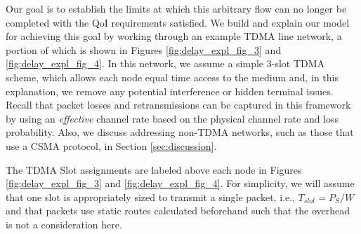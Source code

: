 Our goal is to establish the limits at which this arbitrary flow can no longer be completed with the QoI requirements satisfied.  {\color{blue}We build and explain our model for achieving this goal by working through an example TDMA line network, a portion of which is shown in Figures \ref{fig:delay_expl_fig_3} and \ref{fig:delay_expl_fig_4}. In this network, we assume a simple 3-slot TDMA scheme, which allows each node equal time access to the medium and, in this explanation, we remove any potential interference or hidden terminal issues. Recall that packet losses and retransmissions can be captured in this framework by using an \emph{effective} channel rate based on the physical channel rate and loss probability. Also, we discuss addressing non-TDMA networks, such as those that use a CSMA protocol, in Section \ref{sec:discussion}. }

The TDMA Slot assignments are labeled above each node in Figures \ref{fig:delay_expl_fig_3} and \ref{fig:delay_expl_fig_4}.  For simplicity, we will assume that one slot is appropriately sized to transmit a single packet, i.e., $T_{slot} = P_S/W$ and that packets use static routes calculated beforehand such that the overhead is not a consideration here.

